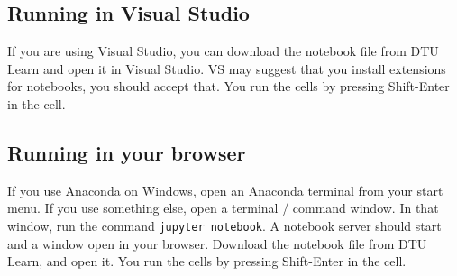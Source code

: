 \documentclass[a4paper,11pt]{article}
\begin{document}
\subsection{Running in Visual Studio}

If you are using Visual Studio, you can download the notebook file
from DTU Learn and open it in Visual Studio.  VS may suggest that you
install extensions for notebooks, you should accept that.  You run the
cells by pressing Shift-Enter in the cell.

\subsection{Running in your browser}

If you use Anaconda on Windows, open an Anaconda terminal from your
start menu.  If you use something else, open a terminal / command
window.  In that window, run the command \texttt{jupyter notebook}.  A
notebook server should start and a window open in your browser.
Download the notebook file from DTU Learn, and open it.  You run the
cells by pressing Shift-Enter in the cell.
\end{document}
